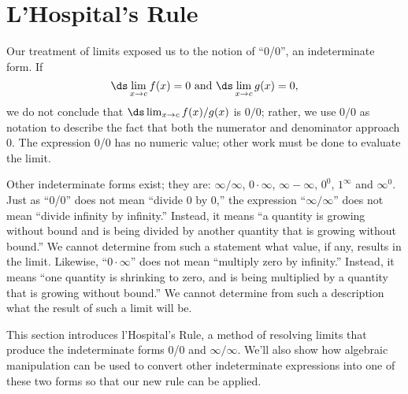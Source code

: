 \section{L'Hospital's Rule}\label{sec:lhopitals_rule}


Our treatment of limits exposed us to the notion of ``0/0'', an indeterminate form. If 
\[
\ds \lim_{x\to c}f(x)=0 \text{ and } \ds \lim_{x\to c} g(x) =0,
\]
we do not conclude that $\ds \lim_{x\to c} f(x)/g(x)$ is $0/0$; rather, we use $0/0$ as notation to describe the fact that both the numerator and denominator approach 0. The expression 0/0 has no numeric value; other work must be done to evaluate the limit.

Other indeterminate forms exist; they are: %
 $\infty/\infty$, $0\cdot\infty$, $\infty-\infty$, $0^0$, $1^\infty$ and $\infty^0$. %
 Just as ``0/0'' does not mean ``divide 0 by 0,'' the expression ``$\infty/\infty$'' does not mean ``divide infinity by infinity.'' Instead, it means ``a quantity is growing without bound and is being divided by another quantity that is growing without bound.'' We cannot determine from such a statement what value, if any, results in the limit. Likewise, ``$0\cdot \infty$'' does not mean ``multiply zero by infinity.'' Instead, it means ``one quantity is shrinking to zero, and is being multiplied by a quantity that is growing without bound.'' We cannot determine from such a description what the result of such a limit will be.


This section introduces l'Hospital's Rule, a method of resolving limits that produce the indeterminate forms 0/0 and $\infty/\infty$. We'll also show how algebraic manipulation can be used to convert other indeterminate expressions into one of these two forms so that our new rule can be applied.

